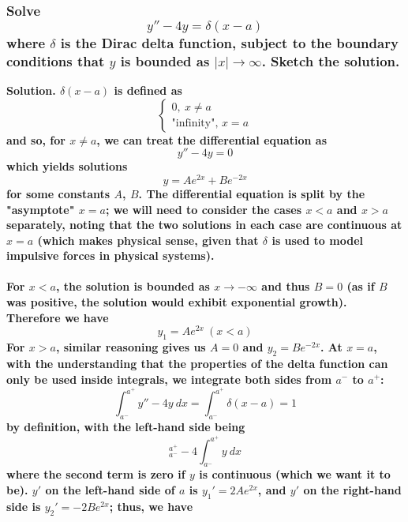 \documentclass{article}
\begin{document}
\hrulefill

\subsubsection*{Solve
\begin{equation*}
    y''-4y=\delta(x-a)
\end{equation*}
where $\delta$ is the Dirac delta function, subject to the boundary conditions that $y$ is bounded as $|x|\to\infty$. Sketch the solution.}
\bf Solution. \normalfont $\delta(x-a)$ is defined as 
\begin{equation*}
    \begin{cases}
        0,\ x \neq a \\
        \text{"infinity", }x=a
    \end{cases}
\end{equation*}
and so, for $x\neq a$, we can treat the differential equation as
\begin{equation*}
    y''-4y=0
\end{equation*}
which yields solutions
\begin{equation*}
    y=Ae^{2x}+Be^{-2x}
\end{equation*}
for some constants $A$, $B$. The differential equation is split by the "asymptote" $x=a$; we will need to consider the cases $x<a$ and $x>a$ separately, noting that the two solutions in each case are continuous at $x=a$ (which makes physical sense, given that $\delta$ is used to model impulsive forces in physical systems). \\ \\
For $x<a$, the solution is bounded as $x\to -\infty$ and thus $B=0$ (as if $B$ was positive, the solution would exhibit exponential growth). Therefore we have 
\begin{equation*}
    y_1=Ae^{2x}\ (x<a)
\end{equation*}
For $x>a$, similar reasoning gives us $A=0$ and $y_2 = Be^{-2x}$. At $x=a$, with the understanding that the properties of the delta function can only be used inside integrals, we integrate both sides from $a^-$ to $a^+$:
\begin{equation*}
    \int^{a^+}_{a^-} y''-4y\ dx = \int^{a^+}_{a^-}\delta(x-a) = 1
\end{equation*}
by definition, with the left-hand side being 
\begin{equation*}
    [y']^{a^+}_{a^-} - 4\int^{a^+}_{a^-}y\ dx
\end{equation*}
where the second term is zero if $y$ is continuous (which we want it to be). $y'$ on the left-hand side of $a$ is $y_1' = 2Ae^{2x}$, and $y'$ on the right-hand side is $y_2'=-2Be^{2x}$; thus, we have 
\end{document}
